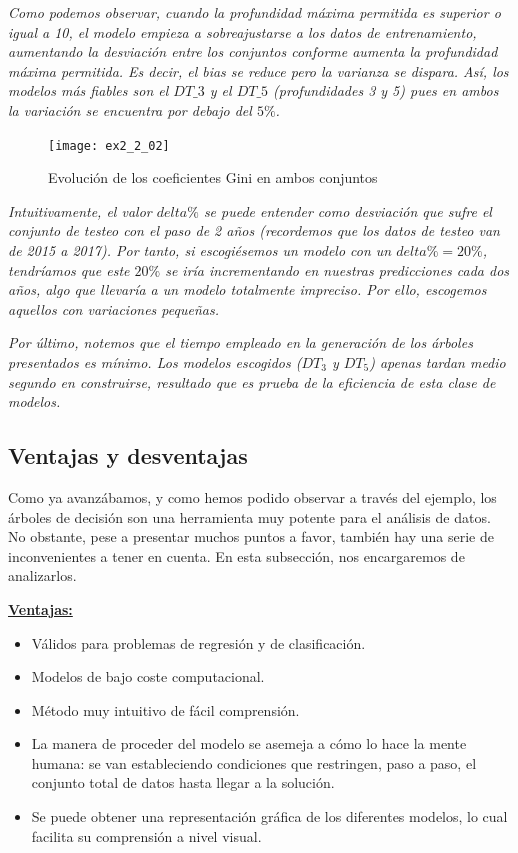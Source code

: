 \documentclass[12pt,twoside]{article}
\begin{document}
\emph{Como podemos observar, cuando la profundidad máxima permitida es superior o igual a 10, el modelo empieza a sobreajustarse a los datos de entrenamiento, aumentando la desviación entre los conjuntos conforme aumenta la profundidad máxima permitida. Es decir, el bias se reduce pero la varianza se dispara. Así, los modelos más fiables son el $DT\_3$ y el $DT\_5$ (profundidades 3 y 5) pues en ambos la variación se encuentra por debajo del $5\%$.}

\begin{figure}[h]
\centering
\texttt{[image: ex2\_2\_02]}
\caption{Evolución de los coeficientes Gini en ambos conjuntos}
\end{figure}

\emph{Intuitivamente, el valor $delta\%$ se puede entender como desviación que sufre el conjunto de testeo con el paso de 2 años (recordemos que los datos de testeo van de 2015 a 2017). Por tanto, si escogiésemos un modelo con un $delta\% = 20\%$, tendríamos que este $20\%$ se iría incrementando en nuestras predicciones cada dos años, algo que llevaría a un modelo totalmente impreciso. Por ello, escogemos aquellos con variaciones pequeñas.}

\emph{Por último, notemos que el tiempo empleado en la generación de los árboles presentados es mínimo. Los modelos escogidos ($DT_3$ y $DT_5$) apenas tardan medio segundo en construirse, resultado que es prueba de la eficiencia de esta clase de modelos.}





\subsection{Ventajas y desventajas}
Como ya avanzábamos, y como hemos podido observar a través del ejemplo, los árboles de decisión son una herramienta muy potente para el análisis de datos. No obstante, pese a presentar muchos puntos a favor, también hay una serie de inconvenientes a tener en cuenta. En esta subsección, nos encargaremos de analizarlos.

\textbf{\underline{Ventajas:}}
\begin{itemize}
\item Válidos para problemas de regresión y de clasificación.
\item Modelos de bajo coste computacional.
\item Método muy intuitivo de fácil comprensión.
\item La manera de proceder del modelo se asemeja a cómo lo hace la mente humana: se van estableciendo condiciones que restringen, paso a paso, el conjunto total de datos hasta llegar a la solución.
\item Se puede obtener una representación gráfica de los diferentes modelos, lo cual facilita su comprensión a nivel visual.
\end{itemize}
\end{document}
